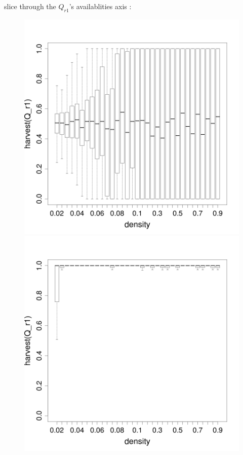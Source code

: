 \documentclass[8pt, handout=show,notes=show]{beamer}
\begin{document}
\begin{frame}{slice through the $Q_{r1}$'s availablities axis : }\addtocounter{framenumber}{-1}

\begin{figure}[H]
\includegraphics[width=\imgSize]{images/harvestr1_density_r1-50.png}
\includegraphics[width=\imgSize]{images/harvestr1_density_r1-70.png}\\

\end{figure}
\end{frame}
\end{document}
